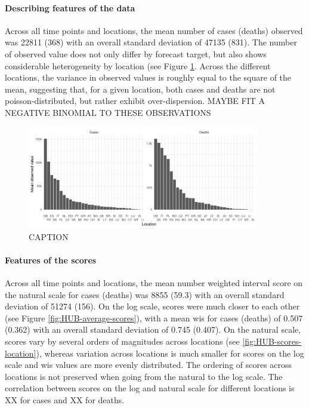 \documentclass{article}
\begin{document}
\paragraph{Describing features of the data}
Across all time points and locations, the mean number of cases (deaths) observed was 22811 (368) with an overall standard deviation of 47135 (831). The number of observed value does not only differ by forecast target, but also shows considerable heterogeneity by location (see Figure \ref{fig:HUB-mean-locations}. Across the different locations, the variance in observed values is roughly equal to the square of the mean, suggesting that, for a given location, both cases and deaths are not poisson-distributed, but rather exhibit over-dispersion. 
MAYBE FIT A NEGATIVE BINOMIAL TO THESE OBSERVATIONS

\begin{figure}[h!]
    \centering
    \includegraphics[width=0.9\textwidth]{output/figures/HUB-mean-obs-location.png}
    \caption{CAPTION}
    \label{fig:HUB-mean-locations}
\end{figure}

\paragraph{Features of the scores}
Across all time points and locations, the mean number weighted interval score on the natural scale for cases (deaths) was 8855 (59.3) with an overall standard deviation of 51274 (156). On the log scale, scores were much closer to each other (see Figure \ref{fig:HUB-average-scores}), with a mean wis for cases (deaths) of 0.507 (0.362) with an overall standard deviation of 0.745 (0.407). 
On the natural scale, scores vary by several orders of magnitudes across locations (see \ref{fig:HUB-scores-location}), whereas variation across locations is much smaller for scores on the log scale and wis values are more evenly distributed. The ordering of scores across locations is not preserved when going from the natural to the log scale. 
The correlation between scores on the log and natural scale for different locations is XX for cases and XX for deaths. 
\end{document}
